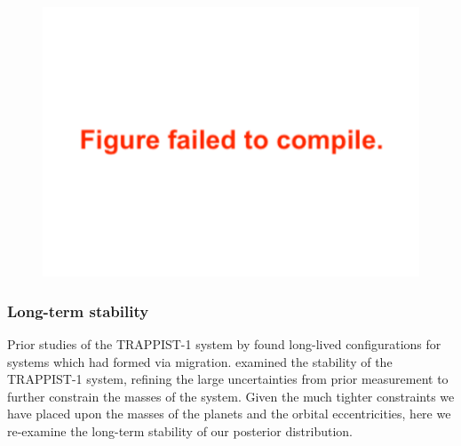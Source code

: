 \documentclass[twocolumn]{aastex63}
\begin{document}
\begin{figure}
    \centering
    \includegraphics[width =\hsize]{figures/Laplace_angle.pdf}
    \label{fig:laplace_angles}
\end{figure}

\subsubsection{Long-term stability}

Prior studies of the TRAPPIST-1 system by
\citet{Tamayo2017} found long-lived configurations for
systems which had formed via migration.  \citet{Quarles2017} examined the stability
of the TRAPPIST-1 system,  refining the large uncertainties from prior
measurement \citep{Gillon2017} to further constrain the masses of
the system.  Given the much tighter constraints we have placed upon
the masses of the planets and the orbital eccentricities, here we
re-examine the long-term stability of our posterior distribution.
\end{document}
